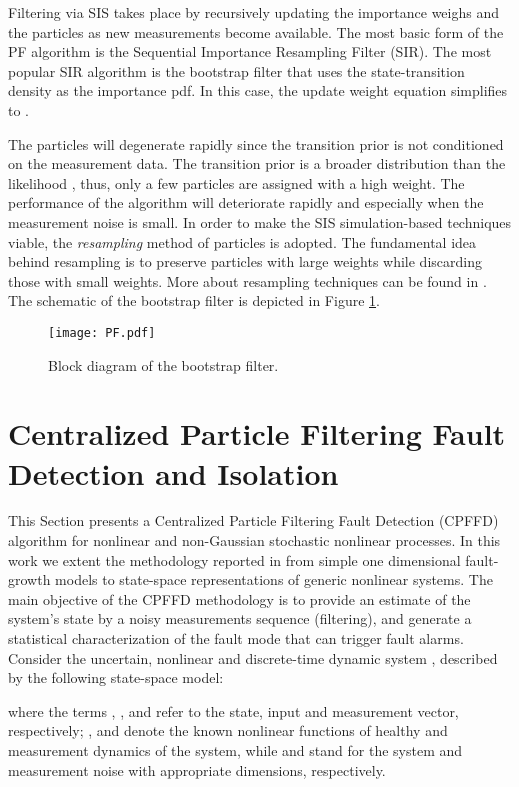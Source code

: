 \documentclass[10pt,twocolumn,twoside]{IEEEtran}
\begin{document}
Filtering via SIS takes place by recursively updating the importance
weighs  and the particles  as new measurements 
become available. The most basic form of the PF algorithm is the Sequential
Importance Resampling Filter (SIR). The most popular SIR algorithm
is the bootstrap filter that uses the state-transition density 
as the importance pdf. In this case, the update weight equation simplifies
to . 

The particles will degenerate rapidly since the transition prior is
not conditioned on the measurement data. The transition prior 
is a broader distribution than the likelihood ,
thus, only a few particles are assigned with a high weight. The performance
of the algorithm will deteriorate rapidly and especially when the
measurement noise is small. In order to make the SIS simulation-based
techniques viable, the \emph{resampling }method of particles is adopted.
The fundamental idea behind resampling is to preserve particles with
large weights while discarding those with small weights. More about
resampling techniques can be found in \cite{ristic2004beyond}. The
schematic of the bootstrap filter is depicted in Figure \ref{fig:Schematic-of-PF}.

\begin{figure}
\centering{}\texttt{[image: PF.pdf]}\caption{Block diagram of the bootstrap filter. \label{fig:Schematic-of-PF} }
\end{figure}

\section{Centralized Particle Filtering Fault Detection and Isolation}\label{sec:Centralized-Particle-Filtering-1}

This Section presents a Centralized Particle Filtering Fault Detection
(CPFFD) algorithm for nonlinear and non-Gaussian stochastic nonlinear
processes. In this work we extent the methodology reported in \cite{orchard2007particle}
from simple one dimensional fault-growth models to state-space representations
of generic nonlinear systems. The main objective of the CPFFD methodology
is to provide an estimate of the system's state by a noisy measurements
sequence (filtering), and generate a statistical characterization
of the fault mode that can trigger fault alarms. Consider the uncertain,
nonlinear and discrete-time dynamic system , described by the
following state-space model:

\noindent where the terms ,
, and 
refer to the state, input and measurement vector, respectively; ,
and  denote the
known nonlinear functions of healthy and measurement dynamics of the
system, while  and  stand
for the system and measurement noise with appropriate dimensions,
respectively. 
\end{document}
